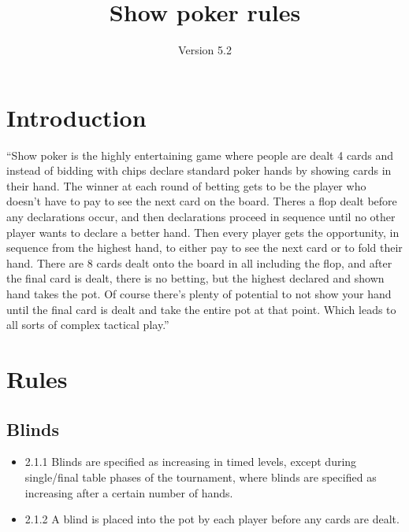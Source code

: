 \documentclass[a4paper,12pt]{article}
\title{Show poker rules}
\author{Version 5.2}
\begin{document}
\maketitle
\pagebreak
\tableofcontents

\pagebreak

\section{Introduction}
“Show poker is the highly entertaining game where people are dealt 4 cards and instead of bidding with chips declare standard poker hands by showing cards in their hand. The winner at each round of betting gets to be the player who doesn’t have to pay to see the next card on the board. Theres a flop dealt before any declarations occur, and then declarations proceed in sequence until no other player wants to declare a better hand. Then every player gets the opportunity, in sequence from the highest hand, to either pay to see the next card or to fold their hand. There are 8 cards dealt onto the board in all including the flop, and after the final card is dealt, there is no betting, but the highest declared and shown hand takes the pot. Of course there’s plenty of potential to not show your hand until the final card is dealt and take the entire pot at that point. Which leads to all sorts of complex tactical play.” 

\pagebreak
\section{Rules}
\subsection{Blinds}
\begin{itemize}

\item
2.1.1 Blinds are specified as increasing in timed levels, except during single/final table phases of the tournament, where blinds are specified as increasing after a certain number of hands.
\item
2.1.2 A blind is placed into the pot by each player before any cards are dealt.


\end{itemize}
\end{document}
